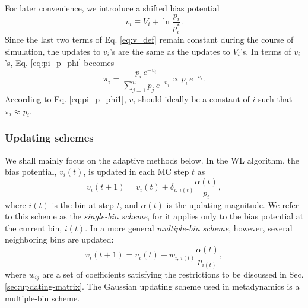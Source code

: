 \documentclass[reprint, floatfix]{revtex4-1}
\begin{document}
For later convenience,
we introduce a shifted bias potential
%
\begin{equation}
  v_i
  \equiv
  V_i
  +
  \ln \frac { p_i }
            { p^*_i }
  .
  \label{eq:v_def}
\end{equation}
%
Since the last two terms of Eq. \eqref{eq:v_def}
remain constant during the course of simulation,
the updates to $v_i$'s are
the same as the updates to $V_i$'s.
%
In terms of $v_i$'s, Eq. \eqref{eq:pi_p_phi}
becomes
%
\begin{equation}
  \pi_i
  =
  \frac{                p_i \, e^{-v_i} }
       { \sum_{j = 1}^n p_j \, e^{-v_j} }
  \propto
  p_i \, e^{-v_i}.
  \label{eq:pi_p_v}
\end{equation}
%
According to Eq. \eqref{eq:pi_p_phi1},
$v_i$ should ideally be a constant of $i$
such that $\pi_i \approx p_i$.




\subsubsection{Updating schemes}



We shall mainly focus on the adaptive methods below.
%
In the WL algorithm\cite{wang2001, wang2001pre},
the bias potential, $v_i(t)$, is updated
in each MC step $t$ as
%
\begin{equation}
  v_i(t+1)
  =
  v_i(t)
  +
  \delta_{i, \, i(t)}
  \frac{ \alpha(t) } { p_i }
  ,
\label{eq:wl_update}
\end{equation}
%
where $i(t)$ is the bin at step $t$,
and $\alpha(t)$ is the updating magnitude.
%
We refer to this scheme as the \emph{single-bin scheme},
for it applies only to the bias potential
at the current bin, $i(t)$.
%
In a more general \emph{multiple-bin scheme}, however,
several neighboring bins are updated:
%
\begin{equation}
  v_i(t+1)
  =
  v_i(t)
  +
  w_{i, \, i(t)}
  \frac{ \alpha(t) }
       { p_{i(t)} },
  \label{eq:mbin_update}
\end{equation}
%
where $w_{ij}$ are a set of coefficients satisfying
the restrictions to be discussed
in Sec. \ref{sec:updating-matrix}.
%
The Gaussian updating scheme
used in metadynamics
is a multiple-bin scheme.
\end{document}
